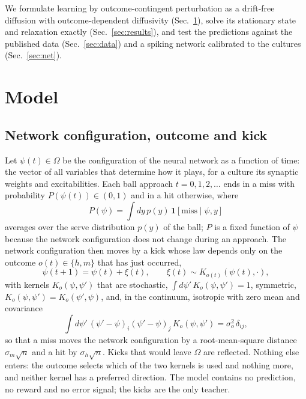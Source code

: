 \documentclass[pre,twocolumn,superscriptaddress,showpacs=false,amsmath,amssymb,nofootinbib]{revtex4-2}
\begin{document}
We formulate learning by outcome-contingent perturbation as a drift-free diffusion with outcome-dependent diffusivity (Sec.~\ref{sec:model}), solve its stationary state and relaxation exactly (Sec.~\ref{sec:results}), and test the predictions against the published data (Sec.~\ref{sec:data}) and a spiking network calibrated to the cultures (Sec.~\ref{sec:net}).

\section{Model}\label{sec:model}

\subsection{Network configuration, outcome and kick}
Let $\psi(t)\in\Omega$ be the configuration of the neural network as a function of time: the vector of all variables that determine how it plays, for a culture its synaptic weights and excitabilities. Each ball approach $t=0,1,2,\dots$ ends in a miss with probability $P(\psi(t))\in(0,1)$ and in a hit otherwise, where
\begin{equation}
P(\psi)=\int dy\,p(y)\,\mathbf{1}[\text{miss}\mid\psi,y]
\label{eq:P}
\end{equation}
averages over the serve distribution $p(y)$ of the ball; $P$ is a fixed function of $\psi$ because the network configuration does not change during an approach. The network configuration then moves by a kick whose law depends only on the outcome $o(t)\in\{h,m\}$ that has just occurred,
\begin{equation}
\psi(t+1)=\psi(t)+\xi(t),\qquad \xi(t)\sim K_{o(t)}(\psi(t),\cdot),
\label{eq:kick}
\end{equation}
with kernels $K_o(\psi,\psi')$ that are stochastic, $\int d\psi'\,K_o(\psi,\psi')=1$, symmetric, $K_o(\psi,\psi')=K_o(\psi',\psi)$, and, in the continuum, isotropic with zero mean and covariance
\begin{equation}
\int d\psi'\,(\psi'-\psi)_i(\psi'-\psi)_j\,K_o(\psi,\psi')=\sigma_o^2\,\delta_{ij},
\label{eq:moments}
\end{equation}
so that a miss moves the network configuration by a root-mean-square distance $\sigma_m\sqrt n$ and a hit by $\sigma_h\sqrt n$. Kicks that would leave $\Omega$ are reflected. Nothing else enters: the outcome selects which of the two kernels is used and nothing more, and neither kernel has a preferred direction. The model contains no prediction, no reward and no error signal; the kicks are the only teacher.
\end{document}
